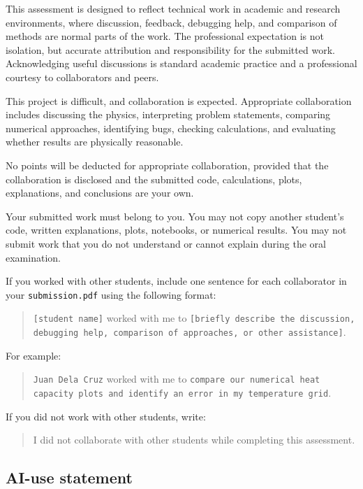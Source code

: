 This assessment is designed to reflect technical work in academic and research environments, where discussion, feedback, debugging help, and comparison of methods are normal parts of the work. The professional expectation is not isolation, but accurate attribution and responsibility for the submitted work. Acknowledging useful discussions is standard academic practice and a professional courtesy to collaborators and peers.

This project is difficult, and collaboration is expected. Appropriate collaboration includes discussing the physics, interpreting problem statements, comparing numerical approaches, identifying bugs, checking calculations, and evaluating whether results are physically reasonable.

No points will be deducted for appropriate collaboration, provided that the collaboration is disclosed and the submitted code, calculations, plots, explanations, and conclusions are your own.

Your submitted work must belong to you. You may not copy another student's code, written explanations, plots, notebooks, or numerical results. You may not submit work that you do not understand or cannot explain during the oral examination.

If you worked with other students, include one sentence for each collaborator in your \texttt{submission.pdf} using the following format:

\begin{quote}
\texttt{[student name]} worked with me to \texttt{[briefly describe the discussion, debugging help, comparison of approaches, or other assistance]}.
\end{quote}

For example:

\begin{quote}
\texttt{Juan Dela Cruz} worked with me to \texttt{compare our numerical heat capacity plots and identify an error in my temperature grid}.
\end{quote}

If you did not work with other students, write:

\begin{quote}
I did not collaborate with other students while completing this assessment.
\end{quote}

\subsection{AI-use statement}


